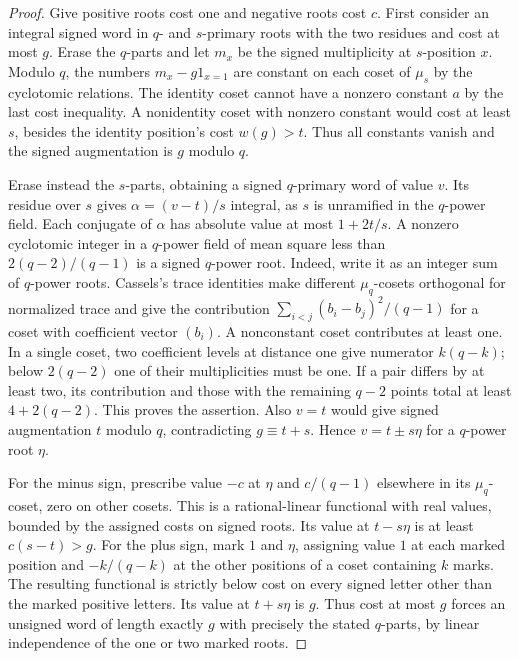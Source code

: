 \documentclass[11pt,a4paper]{article}
\numberwithin{equation}{section}
\theoremstyle{remark}
\begin{document}
\begin{proof}
Give positive roots cost one and negative roots cost $c$.
First consider an integral signed word in $q$- and $s$-primary
roots with the two residues and cost at most $g$. Erase the $q$-parts
and let $m_x$ be the signed multiplicity at $s$-position $x$.
Modulo $q$, the numbers $m_x-g1_{x=1}$ are constant on each coset
of $\mu_s$ by the cyclotomic relations. The identity coset cannot
have a nonzero constant $a$ by the last cost inequality.
A nonidentity coset with nonzero constant would cost at least $s$,
besides the identity position's cost $w(g)>t$. Thus all constants
vanish and the signed augmentation is $g$ modulo $q$.

Erase instead the $s$-parts, obtaining a signed $q$-primary word
of value $v$. Its residue over $s$ gives $\alpha=(v-t)/s$ integral,
as $s$ is unramified in the $q$-power field. Each conjugate of
$\alpha$ has absolute value at most $1+2t/s$. A nonzero cyclotomic
integer in a $q$-power field of mean square less than $2(q-2)/(q-1)$
is a signed $q$-power root. Indeed, write it as an integer sum of
$q$-power roots. Cassels's trace identities \cite[(3.4) and (3.16), pp.~114--115]{Cassels} make different $\mu_q$-cosets orthogonal for normalized trace and give the contribution $\sum_{i<j}(b_i-b_j)^2/(q-1)$ for a coset with coefficient vector $(b_i)$. A nonconstant coset
contributes at least one. In a single coset, two coefficient levels
at distance one give numerator $k(q-k)$; below $2(q-2)$ one of
their multiplicities must be one. If a pair differs by at least two,
its contribution and those with the remaining $q-2$ points total
at least $4+2(q-2)$. This proves the assertion. Also $v=t$ would give
signed augmentation $t$ modulo $q$, contradicting $g\equiv t+s$.
Hence $v=t\pm s\eta$ for a $q$-power root $\eta$.

For the minus sign, prescribe value $-c$ at $\eta$ and
$c/(q-1)$ elsewhere in its $\mu_q$-coset, zero on other cosets.
This is a rational-linear functional with real values, bounded by
the assigned costs on signed roots. Its value at $t-s\eta$ is at least
$c(s-t)>g$. For the plus sign, mark $1$ and $\eta$, assigning
value $1$ at each marked position and $-k/(q-k)$ at the other
positions of a coset containing $k$ marks. The resulting
functional is strictly below cost on every signed letter other
than the marked positive letters. Its value at $t+s\eta$ is $g$.
Thus cost at most $g$ forces an unsigned word of length exactly $g$
with precisely the stated $q$-parts, by linear independence of the
one or two marked roots.


\end{proof}
\end{document}
